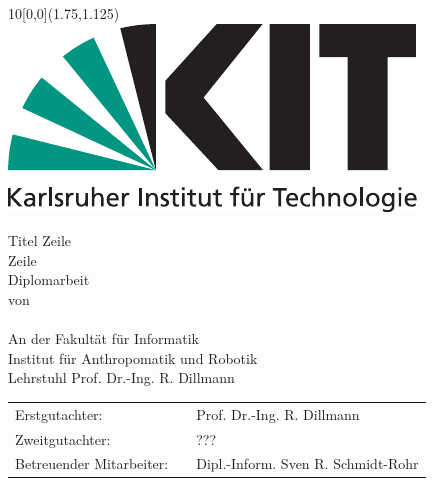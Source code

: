 \newcommand{\diameter}{20}
\newcommand{\xone}{-50}
\newcommand{\xtwo}{450}
\newcommand{\yone}{60}
\newcommand{\ytwo}{-700}

\newcommand{\timestart}{XX. Monat 20XX}
\newcommand{\timeend}{XX. Monat 20XX}
\newcommand{\submissiontime}{DD. MM. 20XX}

\begin{titlepage}

  \begin{textblock}{10}[0,0](1.75,1.125)
    \includegraphics[width=.3\textwidth]{bilder/Kitlogo_de_rgb.pdf}
  \end{textblock}

  \vspace*{3.5cm}
  \begin{center}
    \Huge{Titel Zeile\\Zeile}\\
    \vspace*{2cm}
    \Large{Diplomarbeit\\von}\\
    \vspace*{1cm}
    \huge{\myname}\\
    \vspace*{1cm}
    \Large{An der Fakultät für Informatik\\Institut für Anthropomatik und Robotik\\Lehrstuhl Prof. Dr.-Ing. R. Dillmann}
  \end{center}

  \vspace*{1cm}
  \Large{
    \begin{center}
      \begin{tabular}[ht]{l c l}
        Erstgutachter: & \hfill  & Prof. Dr.-Ing. R. Dillmann\\
        Zweitgutachter: & \hfill  & ???\\
        Betreuender Mitarbeiter: & \hfill  & Dipl.-Inform. Sven R. Schmidt-Rohr\\
      \end{tabular}
    \end{center}
  }


\end{titlepage}
